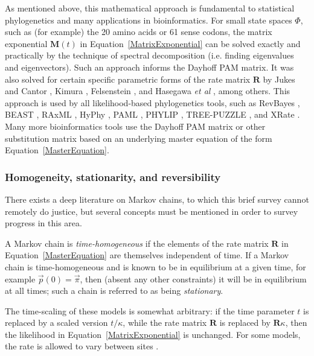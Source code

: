 \documentclass{bmcart}
\newcommand{\matr}[1]{\mathbf{#1}}
\newcommand{\eqref}[1]{Equation~\ref{#1}}
\newcommand{\statespace}{\Phi}
\newcommand{\statevec}{\vec{p}}
\newcommand{\ratematrix}{\matr{R}}
\newcommand{\eqmvec}{\vec{\pi}}
\newcommand{\condmatrix}{\matr{M}}
\begin{document}
As mentioned above, this mathematical approach is fundamental to statistical phylogenetics
and many applications in bioinformatics.
For small state spaces $\statespace$, such as (for example) the 20 amino acids or 61 sense codons,
the matrix exponential $\condmatrix(t)$ in \eqref{MatrixExponential} can be solved exactly and practically
by the technique of spectral decomposition (i.e. finding eigenvalues and eigenvectors).
Such an approach informs the Dayhoff PAM matrix.
It was also solved for certain specific parametric forms of the rate matrix $\ratematrix$
by Jukes and Cantor \cite{JukesCantor69}, Kimura \cite{Kimura80}, Felsenstein \cite{Felsenstein81},
and Hasegawa {\em et al} \cite{HasegawaEtal85}, among others.
This approach is used by all likelihood-based phylogenetics tools, such as
RevBayes \cite{HohnaEtAl2016},
BEAST \cite{pmid17996036},
RAxML \cite{pmid16928733},
HyPhy \cite{pmid15509596},
PAML \cite{pmid17483113},
PHYLIP \cite{Felsenstein1989},
TREE-PUZZLE \cite{pmid11934758},
and XRate \cite{pmid22693624}.
Many more bioinformatics tools use the Dayhoff PAM matrix or other substitution matrix
based on an underlying master equation of the form \eqref{MasterEquation}.

\subsubsection*{Homogeneity, stationarity, and reversibility}

There exists a deep literature on Markov chains, to which this brief survey cannot remotely do justice,
but several concepts must be mentioned in order to survey progress in this area.

A Markov chain is {\em time-homogeneous} if the elements of the
rate matrix $\ratematrix$ in \eqref{MasterEquation} are themselves independent of time.
If a Markov chain is time-homogeneous and is known to be in equilibrium at a given time,
for example $\statevec(0) = \eqmvec$,
then (absent any other constraints) it will be in equilibrium at all times;
such a chain is referred to as being {\em stationary}.

The time-scaling of these models is somewhat arbitrary:
if the time parameter $t$ is replaced by a scaled version $t/\kappa$,
while the rate matrix $\ratematrix$ is replaced by $\ratematrix \kappa$,
then the likelihood in \eqref{MatrixExponential} is unchanged.
For some models, the rate is allowed to vary between sites \cite{Yang93,Yang94}.
\end{document}
